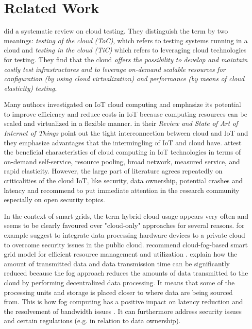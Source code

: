 \section{Related Work}

\citeauthor{bertolino2019systematic} did a systematic review on cloud testing. They distinguish the term by two meanings: \textit{testing of the cloud (ToC)}, which refers to testing systems running in a cloud and \textit{testing in the cloud (TiC)} which refers to leveraging cloud technologies for testing. They find that the cloud \textit{offers the possibility to develop and maintain costly test infrastructures and to leverage on-demand scalable resources for configuration (by using cloud virtualization) and performance (by means of cloud elasticity) testing.}

Many authors investigated on IoT cloud computing and emphasize its potential to improve efficiency and reduce costs in IoT because computing resources can be scaled and virtualized in a flexible manner. \citeauthor{laghari2021review} in their \textit{Review and State of Art of Internet of Things} point out the tight interconnection between cloud and IoT and they emphasize advantages that the intermingling of IoT and cloud have. \citeauthor{almolhis2020security} attest the beneficial characteristics of cloud computing in IoT technologies in terms of on-demand self-service, resource pooling, broad network, measured service, and rapid elasticity. However, the large part of literature agrees repeatedly on criticalities of the cloud IoT, like security, data ownership, potential crashes and latency and \citeauthor{almolhis2020security} recommend to put immediate attention in the research community especially on open security topics.

In the context of smart grids, the term hybrid-cloud usage appears very often and seems to be clearly favoured over "cloud-only" approaches for several reasons. \citeauthor{talaat2020hybrid} for example suggest to integrate data processing hardware devices to a private cloud to overcome security issues in the public cloud. \citeauthor{zahoor2018cloudmanag} recommend cloud-fog-based smart grid model for efficient resource management \cite{zahoor2018cloudmanag} and utilization \cite{zahoor2018cloudutil}. \citeauthor{zahoor2018cloudmanag} explain how the amount of transmitted data and data transmission time can be significantly reduced because the fog approach reduces the amounts of data transmitted to the cloud by performing decentralized data processing. It means that some of the processing units and storage is placed closer to where data are being sourced from. This is how fog computing has a positive impact on latency reduction and the resolvement of bandwidth issues \cite{forcan2020cloud}. It can furthermore address security issues and certain regulations (e.g. in relation to data ownership).

